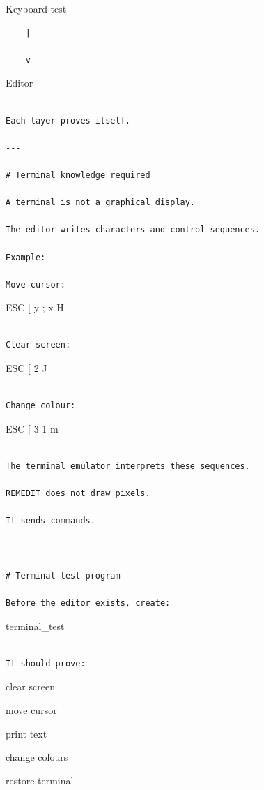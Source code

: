 \documentclass[
  oneside,
  openany]{book}
\begin{document}
Keyboard test

\begin{verbatim}
    |

    v
\end{verbatim}

Editor

\begin{verbatim}

Each layer proves itself.

---

# Terminal knowledge required

A terminal is not a graphical display.

The editor writes characters and control sequences.

Example:

Move cursor:
\end{verbatim}

ESC {[} y ; x H

\begin{verbatim}

Clear screen:
\end{verbatim}

ESC {[} 2 J

\begin{verbatim}

Change colour:
\end{verbatim}

ESC {[} 3 1 m

\begin{verbatim}

The terminal emulator interprets these sequences.

REMEDIT does not draw pixels.

It sends commands.

---

# Terminal test program

Before the editor exists, create:
\end{verbatim}

terminal\_test

\begin{verbatim}

It should prove:
\end{verbatim}

clear screen

move cursor

print text

change colours

restore terminal
\end{document}
